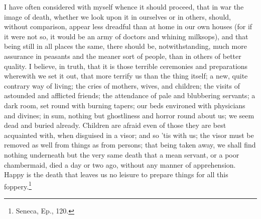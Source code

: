 I have often considered with myself whence it should proceed, that in
war the image of death, whether we look upon it in ourselves or in
others, should, without comparison, appear less dreadful than at home
in our own houses (for if it were not so, it would be an army of
doctors and whining milksops), and that being still in all places the
same, there should be, notwithstanding, much more assurance in
peasants and the meaner sort of people, than in others of better
quality. I believe, in truth, that it is those terrible ceremonies and
preparations wherewith we set it out, that more terrify us than the
thing itself; a new, quite contrary way of living; the cries of
mothers, wives, and children; the visits of astounded and afflicted
 friends; the attendance of pale and blubbering servants; a
dark room, set round with burning tapers; our beds environed with
physicians and divines; in sum, nothing but ghostliness and horror
round about us; we seem dead and buried already. Children are afraid
even of those they are best acquainted with, when disguised in a
visor; and so 'tis with us; the visor must be removed as well from
things as from persons; that being taken away, we shall find nothing
underneath but the very same death that a mean servant, or a poor
chambermaid, died a day or two ago, without any manner of
apprehension. Happy is the death that leaves us no leisure to prepare
things for all this foppery.\footnote{Seneca, Ep., 120.}

